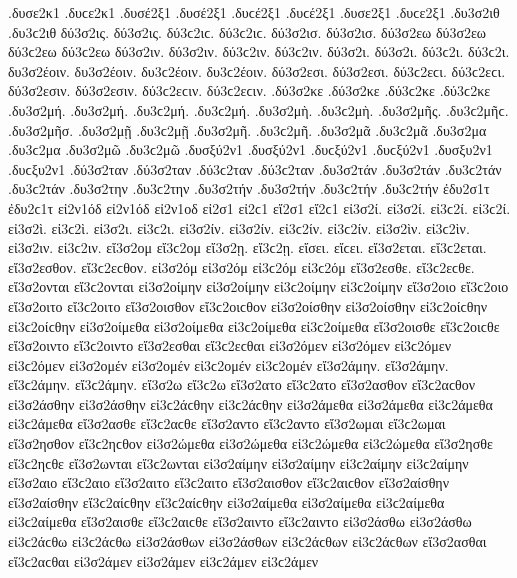 {.δυσε2κ1 .δυϲε2κ1
.δυσέ2ξ1 .δυσέ2ξ1 .δυϲέ2ξ1 .δυϲέ2ξ1   %
.δυσε2ξ1 .δυϲε2ξ1
.δυ3σ2ιθ .δυ3ϲ2ιθ   %
δύ3σ2ις. δύ3σ2ις. δύ3ϲ2ιϲ. δύ3ϲ2ιϲ.   %
δύ3σ2ισ. δύ3σ2ισ.
δύ3σ2εω δύ3σ2εω δύ3ϲ2εω δύ3ϲ2εω
δύ3σ2ιν. δύ3σ2ιν. δύ3ϲ2ιν. δύ3ϲ2ιν.
δύ3σ2ι. δύ3σ2ι. δύ3ϲ2ι. δύ3ϲ2ι.
δυ3σ2έοιν. δυ3σ2έοιν. δυ3ϲ2έοιν. δυ3ϲ2έοιν.
δύ3σ2εσι. δύ3σ2εσι. δύ3ϲ2εϲι. δύ3ϲ2εϲι.
δύ3σ2εσιν. δύ3σ2εσιν. δύ3ϲ2εϲιν. δύ3ϲ2εϲιν.
.δύ3σ2κε .δύ3σ2κε .δύ3ϲ2κε .δύ3ϲ2κε   %
.δυ3σ2μή. .δυ3σ2μή. .δυ3ϲ2μή. .δυ3ϲ2μή.   %
.δυ3σ2μὴ. .δυ3ϲ2μὴ.
.δυ3σ2μῆς. .δυ3ϲ2μῆϲ.
.δυ3σ2μῆσ.
.δυ3σ2μῇ .δυ3ϲ2μῇ
.δυ3σ2μῆ. .δυ3ϲ2μῆ.
.δυ3σ2μᾶ .δυ3ϲ2μᾶ
.δυ3σ2μα .δυ3ϲ2μα
.δυ3σ2μῶ .δυ3ϲ2μῶ
.δυσξύ2ν1 .δυσξύ2ν1 .δυϲξύ2ν1 .δυϲξύ2ν1   %
.δυσξυ2ν1 .δυϲξυ2ν1
.δύ3σ2ταν .δύ3σ2ταν .δύ3ϲ2ταν .δύ3ϲ2ταν   %
.δυ3σ2τάν .δυ3σ2τάν .δυ3ϲ2τάν .δυ3ϲ2τάν
.δυ3σ2την .δυ3ϲ2την   %
.δυ3σ2τήν .δυ3σ2τήν .δυ3ϲ2τήν .δυ3ϲ2τήν
ἐδυ2σ1τ ἐδυ2ϲ1τ   %
εἰ2ν1όδ εἰ2ν1όδ   %
εἰ2ν1οδ
εἰ2σ1 εἰ2ϲ1   %
εἴ2σ1 εἴ2ϲ1
εἰ3σ2ί. εἰ3σ2ί. εἰ3ϲ2ί. εἰ3ϲ2ί.   %
εἰ3σ2ὶ. εἰ3ϲ2ὶ.
εἰ3σ2ι. εἰ3ϲ2ι.
εἰ3σ2ίν. εἰ3σ2ίν. εἰ3ϲ2ίν. εἰ3ϲ2ίν.
εἰ3σ2ὶν. εἰ3ϲ2ὶν.
εἰ3σ2ιν. εἰ3ϲ2ιν.
εἴ3σ2ομ εἴ3ϲ2ομ   %
εἴ3σ2ῃ. εἴ3ϲ2ῃ. εἴσει. εἴϲει.
εἴ3σ2εται. εἴ3ϲ2εται.
εἴ3σ2εσθον. εἴ3ϲ2εϲθον.
εἰ3σ2όμ εἰ3σ2όμ εἰ3ϲ2όμ εἰ3ϲ2όμ   %
εἴ3σ2εσθε. εἴ3ϲ2εϲθε.
εἴ3σ2ονται εἴ3ϲ2ονται
%
εἰ3σ2οίμην εἰ3σ2οίμην εἰ3ϲ2οίμην εἰ3ϲ2οίμην
εἴ3σ2οιο εἴ3ϲ2οιο
εἴ3σ2οιτο εἴ3ϲ2οιτο
εἴ3σ2οισθον εἴ3ϲ2οιϲθον
εἰ3σ2οίσθην εἰ3σ2οίσθην εἰ3ϲ2οίϲθην εἰ3ϲ2οίϲθην
εἰ3σ2οίμεθα εἰ3σ2οίμεθα εἰ3ϲ2οίμεθα εἰ3ϲ2οίμεθα
εἴ3σ2οισθε εἴ3ϲ2οιϲθε
εἴ3σ2οιντο εἴ3ϲ2οιντο
%
εἴ3σ2εσθαι εἴ3ϲ2εϲθαι
εἰ3σ2όμεν εἰ3σ2όμεν εἰ3ϲ2όμεν εἰ3ϲ2όμεν   %
εἰ3σ2ομέν εἰ3σ2ομέν εἰ3ϲ2ομέν εἰ3ϲ2ομέν
%
εἴ3σ2άμην. εἴ3σ2άμην. εἴ3ϲ2άμην. εἴ3ϲ2άμην.
εἴ3σ2ω εἴ3ϲ2ω
εἴ3σ2ατο εἴ3ϲ2ατο
εἴ3σ2ασθον εἴ3ϲ2αϲθον
εἰ3σ2άσθην εἰ3σ2άσθην εἰ3ϲ2άϲθην εἰ3ϲ2άϲθην
εἰ3σ2άμεθα εἰ3σ2άμεθα εἰ3ϲ2άμεθα εἰ3ϲ2άμεθα
εἴ3σ2ασθε εἴ3ϲ2αϲθε
εἴ3σ2αντο εἴ3ϲ2αντο
%
εἴ3σ2ωμαι εἴ3ϲ2ωμαι
εἴ3σ2ησθον εἴ3ϲ2ηϲθον
εἰ3σ2ώμεθα εἰ3σ2ώμεθα εἰ3ϲ2ώμεθα εἰ3ϲ2ώμεθα
εἴ3σ2ησθε εἴ3ϲ2ηϲθε
εἴ3σ2ωνται εἴ3ϲ2ωνται
%
εἰ3σ2αίμην εἰ3σ2αίμην εἰ3ϲ2αίμην εἰ3ϲ2αίμην
εἴ3σ2αιο εἴ3ϲ2αιο
εἴ3σ2αιτο εἴ3ϲ2αιτο
εἴ3σ2αισθον εἴ3ϲ2αιϲθον
εἴ3σ2αίσθην εἴ3σ2αίσθην εἴ3ϲ2αίϲθην εἴ3ϲ2αίϲθην
εἰ3σ2αίμεθα εἰ3σ2αίμεθα εἰ3ϲ2αίμεθα εἰ3ϲ2αίμεθα
εἴ3σ2αισθε εἴ3ϲ2αιϲθε
εἴ3σ2αιντο εἴ3ϲ2αιντο
%
εἰ3σ2άσθω εἰ3σ2άσθω εἰ3ϲ2άϲθω εἰ3ϲ2άϲθω
εἰ3σ2άσθων εἰ3σ2άσθων εἰ3ϲ2άϲθων εἰ3ϲ2άϲθων
%
εἴ3σ2ασθαι εἴ3ϲ2αϲθαι
εἰ3σ2άμεν εἰ3σ2άμεν εἰ3ϲ2άμεν εἰ3ϲ2άμεν   %
}
